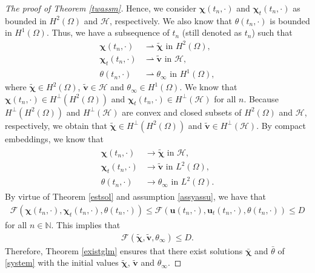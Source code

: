 \documentclass[11pt]{article}
\numberwithin{equation}{section}
\theoremstyle{plain}
\newcommand\bb[1]{\mathbf{#1}}
\newcommand{\n}{\mathbb{N}}
\newcommand{\tn}{\Omega}
\newcommand{\htwo}{H^2(\Omega)}
\renewcommand{\hom}{H^1(\tn)}
\newcommand{\ld}{L^2(\Omega)}
\newcommand{\hp}{H^{\perp}}
\newcommand{\F}{\mathcal{F}}
\newcommand{\bu}{\bb{u}}
\newcommand{\bs}[1]{\boldsymbol{#1}}
\renewcommand{\H}{\mathcal{H}}
\begin{document}
\begin{proof}[The proof of Theorem \ref{twassm}]
Hence, we consider $\bs\chi(t_n,\cdot)$ and $\bs\chi_t(t_n,\cdot)$ as bounded in $\htwo$ and $\H$, respectively. We also know that $\theta(t_n,\cdot)$ is
bounded in $\hom$. Thus, we have a subsequence of $t_n$ (still denoted as $t_n$) such that
\begin{align*}
\bs\chi(t_n,\cdot)&\rightharpoonup \tilde{\bs\chi}\textrm{ in }\htwo,\nonumber\\
\bs\chi_t(t_n,\cdot)&\rightharpoonup\tilde{\bb v}\textrm{ in }\H,\\
\theta(t_n,\cdot)&\rightharpoonup\theta_{\infty}\textrm{ in }\hom,\nonumber
\end{align*}
where $\tilde{\bs\chi}\in\htwo$, $\tilde{\bb v}\in\H$ and $\theta_{\infty}\in\hom$. We know that $\bs\chi(t_n,\cdot)\in\hp(\htwo)$ and $\bs\chi_t(t_n,\cdot)\in\hp(\H)$ for all $n$. Because $\hp(\htwo)$ and $\hp(\H)$ are convex and closed subsets of $\htwo$ and  $\H$, respectively, we obtain that $\tilde{\bs\chi}\in\hp(\htwo)$ and $\tilde{\bb v}\in\hp(\H)$. By compact embeddings, we know that
\begin{align*}
\begin{split}
\bs\chi(t_n,\cdot)&\to \tilde{\bs\chi}\textrm{ in }\H,\\
\bs\chi_t(t_n,\cdot)&\to\tilde{\bb v}\textrm{ in }\ld,\\
\theta(t_n,\cdot)&\to\theta_{\infty}\textrm{ in }\ld.
\end{split}
\end{align*}
By virtue of Theorem \ref{estsol} and assumption \eqref{assyassu}, we have that 
\begin{align*}
\F(\bs\chi(t_n,\cdot),\bs\chi_t(t_n,\cdot),\theta(t_n,\cdot))\leq \F(\bu(t_n,\cdot),\bu_t(t_n,\cdot),\theta(t_n,\cdot))\leq D
\end{align*}
for all $n\in\n$. This implies that
\begin{align*}
\F(\tilde{\bs\chi},\tilde{\bb v},\theta_{\infty})\leq D.
\end{align*}
Therefore, Theorem \ref{existglm} ensures that there exist solutions $\bar{\bs\chi}$ and
$\bar\theta$ of \eqref{system} with the initial values $\tilde{\bs\chi}$, $\tilde{\bb v}$ and $\theta_{\infty}$.


\end{proof}
\end{document}
